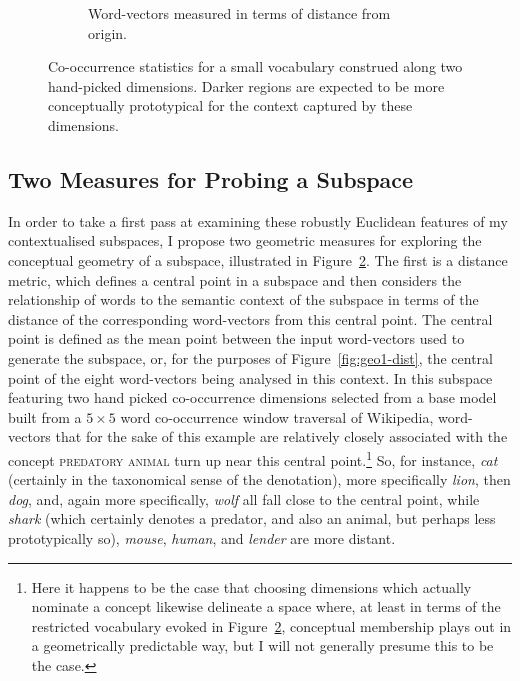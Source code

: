 \begin{figure}
\begin{subfigure}[]{0.45\textwidth}
  \caption{Word-vectors measured in terms of distance from origin.}\label{fig:geo1-norm}
  \end{subfigure}
  \caption[Two Methods for Probing a Subspace]{Co-occurrence statistics for a small vocabulary construed along two hand-picked dimensions.  Darker regions are expected to be more conceptually prototypical for the context captured by these dimensions.}\label{fig:geo1}
\end{figure}

\subsection{Two Measures for Probing a Subspace} \label{sec:twomeasures}

In order to take a first pass at examining these robustly Euclidean features of my contextualised subspaces, I propose two geometric measures for exploring the conceptual geometry of a subspace, illustrated in Figure~\ref{fig:geo1}.  The first is a distance metric, which defines a central point in a subspace and then considers the relationship of words to the semantic context of the subspace in terms of the distance of the corresponding word-vectors from this central point.  The central point is defined as the mean point between the input word-vectors used to generate the subspace, or, for the purposes of Figure~\ref{fig:geo1-dist}, the central point of the eight word-vectors being analysed in this context.  In this subspace featuring two hand picked co-occurrence dimensions selected from a base model built from a $5 \times 5$ word co-occurrence window traversal of Wikipedia, word-vectors that for the sake of this example are relatively closely associated with the concept \textsc{predatory animal} turn up near this central point.\footnote{Here it happens to be the case that choosing dimensions which actually nominate a concept likewise delineate a space where, at least in terms of the restricted vocabulary evoked in Figure~\ref{fig:geo1}, conceptual membership plays out in a geometrically predictable way, but I will not generally presume this to be the case.}  So, for instance, \emph{cat} (certainly in the taxonomical sense of the denotation), more specifically \emph{lion}, then \emph{dog}, and, again more specifically, \emph{wolf} all fall close to the central point, while \emph{shark} (which certainly denotes a predator, and also an animal, but perhaps less prototypically so), \emph{mouse}, \emph{human}, and \emph{lender} are more distant.

